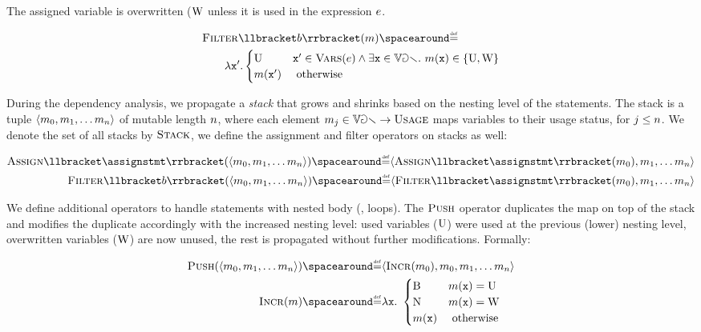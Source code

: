 The assigned variable is overwritten ($\textup{W}$ unless it is used in the expression $e$.

\begin{align*}
  & \usagefilter\semanticsof{\defbexp}(\usagemap) \DefeQ \\
  &\qquad \lambda \defvariable'.
  \begin{cases}
    \usedtag & \defvariable' \in \variablesof{\defaexp} \land \exists \defvariable \in \variables.\spacer \usagemap(\defvariable) \in\{ \usedtag, \overwrittentag\} \\
    \usagemap(\defvariable') & \text{ otherwise}
  \end{cases}
\end{align*}

During the dependency analysis, we propagate a \emph{stack} that grows and shrinks based on the nesting level of the statements.
The stack is a tuple $\langle m_0, m_1, \dots m_n \rangle$ of mutable length $n$, where each element $m_j\in\mathbb{Var} \to\textsc{Usage}$ maps variables to their usage status, for $j\le n$. We denote the set of all stacks by $\textsc{Stack}$, we define the assignment and filter operators on stacks as well:

\begin{align*}
  \usageassign\semanticsof{\assignstmt}(\stacktuple{\usagemap_0}) \DefeQ
    \stacktuple{\usageassign\semanticsof{\assignstmt}(\usagemap_0)}
  \\
  \usagefilter\semanticsof{\defbexp}(\stacktuple{\usagemap_0}) \DefeQ
  \stacktuple{\usagefilter\semanticsof{\assignstmt}(\usagemap_0)}
\end{align*}

We define additional operators to handle statements with nested body (\eg, loops).
The $\textup{\textsc{Push}}$ operator duplicates the map on top of the stack and modifies the duplicate accordingly with the increased nesting level: used variables ($\textup{U}$) were used at the previous (lower) nesting level, overwritten variables ($\textup{W}$) are now unused, the rest is propagated without further modifications. Formally:

\begin{align*}
  \usagepush(\stacktupleinit) &\DefeQ \stacktuple{\usageincr(\usagemap_0), \usagemap_0} \\
  \usageincr(\usagemap) &\DefeQ \lambda \defvariable.\spacer \begin{cases}
    \belowtag & \usagemap(\defvariable) = \usedtag \\
    \unusedtag & \usagemap(\defvariable) = \overwrittentag \\
    \usagemap(\defvariable) & \text{ otherwise}
  \end{cases}
\end{align*}

